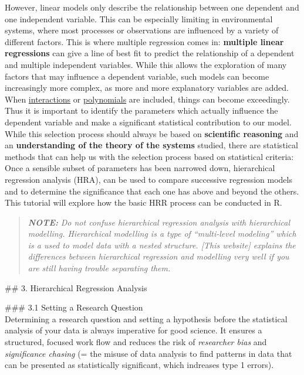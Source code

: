 \documentclass[
]{article}
\begin{document}
However, linear models only describe the relationship between one
dependent and one independent variable. This can be especially limiting
in environmental systems, where most processes or observations are
influenced by a variety of different factors. This is where multiple
regression comes in: \textbf{multiple linear regressions} can give a
line of best fit to predict the relationship of a dependent and multiple
independent variables. While this allows the exploration of many factors
that may influence a dependent variable, such models can become
increasingly more complex, as more and more explanatory variables are
added. When \href{}{interactions} or \href{}{polynomials} are included,
things can become exceedingly. Thus it is important to identify the
parameters which actually influence the dependent variable and make a
significant statistical contribution to our model. While this selection
process should always be based on \textbf{scientific reasoning} and an
\textbf{understanding of the theory of the systems} studied, there are
statistical methods that can help us with the selection process based on
statistical criteria: Once a sensible subset of parameters has been
narrowed down, hierarchical regression analysis (HRA), can be used to
compare successive regression models and to determine the significance
that each one has above and beyond the others. This tutorial will
explore how the basic HRR process can be conducted in R.

\begin{quote}
\textbf{\emph{NOTE:}} \emph{Do not confuse hierarchical regression
analysis with hierarchical modelling. Hierarchical modelling is a type
of ``multi-level modeling'' which is a used to model data with a nested
structure. {[}This website{]} explains the differences between
hierarchical regression and modelling very well if you are still having
trouble separating them.}
\end{quote}

\#\# 3. Hierarchical Regression Analysis

\#\#\# 3.1 Setting a Research Question\\
Determining a research question and setting a hypothesis before the
statistical analysis of your data is always imperative for good science.
It ensures a structured, focused work flow and reduces the risk of
\emph{researcher bias} and \emph{significance chasing} (= the misuse of
data analysis to find patterns in data that can be presented as
statistically significant, which indreases type 1 errors).
\end{document}
